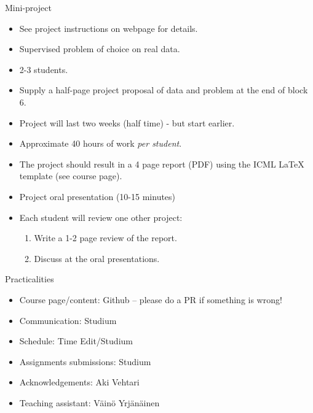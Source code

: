 \documentclass[10pt,handout]{beamer}
\begin{document}
\begin{frame}{Mini-project}

\begin{itemize}
\item See project instructions on webpage for details.\pause
\item Supervised problem of choice on real data.
\item 2-3 students.\pause
\item Supply a half-page project proposal of data and problem at the end of block 6.\pause
\item Project will last two weeks (half time) - but start earlier.
\item Approximate 40 hours of work \emph{per student}.\pause
\item The project should result in a 4 page report (PDF) using the ICML LaTeX template (see course page).
\item Project oral presentation (10-15 minutes)\pause
\item Each student will review one other project:
\begin{enumerate}
\item Write a 1-2 page review of the report.
\item Discuss at the oral presentations.
\end{enumerate}
\end{itemize}
\end{frame}




\begin{frame}{Practicalities}

\begin{itemize}
\item Course page/content: Github -- please do a PR if something is wrong!\pause
\item Communication: Studium\pause
\item Schedule: Time Edit/Studium
\item Assignments submissions: Studium\pause
\item Acknowledgements: Aki Vehtari\pause
\item Teaching assistant: Väinö Yrjänäinen
\end{itemize}

\end{frame}
\end{document}
